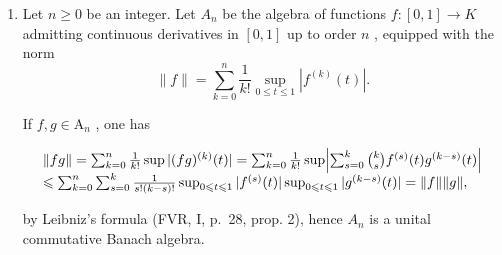 \begin{enumerate}
If X is discrete, one has \(\mathcal{C}_b(\mathrm{X};\mathrm{K}) = \mathcal{B}(\mathrm{X};\mathrm{K})\) .

If X is compact, one has \(\mathcal{C}_{b}(\mathrm{X};\mathrm{K}) = \mathcal{H}(\mathrm{X};\mathrm{K}) = \mathcal{C}(\mathrm{X};\mathrm{K})\) , the unital normed algebra \(\mathcal{C}(\mathrm{X};\mathrm{K})\) of continuous functions on X with values in K. In this case, an element \(f \in \mathcal{C}(\mathrm{X};\mathrm{K})\) is invertible if and only if f does not take the value 0, and the spectrum of f is equal to the set \(f(\mathrm{X})\) of values of f.

Suppose henceforth that X is not compact. The algebra \(\mathcal{C}_{0}(X;K)\) is then not unital; the algebra obtained from it by adjoining a unit element is identified with the subalgebra \(K \cdot 1 \oplus \mathcal{C}_{0}(X;K)\) of \(\mathcal{C}(X;K)\) formed by functions that have a limit at infinity. For an element of this subalgebra to be invertible, it is necessary and sufficient that it does not vanish and that its limit at infinity is not zero. It follows that for every \(f \in \mathcal{C}_{0}(X;K)\) , the spectrum of f is equal to \(f(X) \cup \{0\}\) .

The spectrum of \(f \in \mathcal{K}(\mathrm{X};\mathrm{K})\) is equal to \(f(\mathrm{X})\) (indeed, if \(\mathrm{X}\) is not compact, 0 belongs to \(f(\mathrm{X})\) ).

\item
  Let \(n \geqslant 0\) be an integer. Let \(A_{n}\) be the algebra of functions \(f: [0,1] \to K\) admitting continuous derivatives in \([0,1]\) up to order \(n\) , equipped with the norm
\[
\| f \| = \sum_ {k = 0} ^ {n} \frac {1}{k !} \sup _ {0 \leqslant t \leqslant 1} | f ^ {(k)} (t) |.
\]

If \(f,g\in \mathrm{A}_n\) , one has

\[
\begin{array}{l} \| f g \| = \sum_ {k = 0} ^ {n} \frac {1}{k !} \sup | (f g) ^ {(k)} (t) | = \sum_ {k = 0} ^ {n} \frac {1}{k !} \sup \Bigl | \sum_ {s = 0} ^ {k} \binom {k} {s} f ^ {(s)} (t) g ^ {(k - s)} (t) \Bigr | \\ \leqslant \sum_ {k = 0} ^ {n} \sum_ {s = 0} ^ {k} \frac {1}{s ! (k - s) !} \sup _ {0 \leqslant t \leqslant 1} | f ^ {(s)} (t) | \sup _ {0 \leqslant t \leqslant 1} | g ^ {(k - s)} (t) | = \| f \|   \| g \|, \end{array}
\]

by Leibniz's formula (FVR, I, p.~28, prop. 2), hence \(A_{n}\) is a unital commutative Banach algebra.


\end{enumerate}
